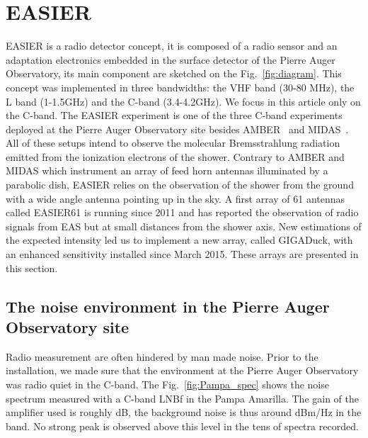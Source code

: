 \section{EASIER}
EASIER is a radio detector concept, it is composed of a radio sensor and an adaptation electronics embedded in the surface detector of the Pierre Auger Observatory, its main component are sketched on the Fig.~\ref{fig:diagram}. This concept was implemented in three bandwidths: the VHF band (30-80 MHz), the L band (1-1.5GHz) and the C-band (3.4-4.2GHz). We focus in this article only on the C-band. The  EASIER experiment  is one  of the  three C-band experiments  deployed at  the  Pierre Auger  Observatory site  besides AMBER~\cite{Gorham} and MIDAS~\cite{midas}. All of these setups intend to observe the molecular Bremsstrahlung radiation emitted from the ionization electrons of the shower. Contrary to AMBER and MIDAS which instrument an array of feed  horn antennas illuminated by a parabolic  dish, EASIER  relies on the observation of the shower  from the  ground with  a wide  angle antenna  pointing up in the sky.
A first array of 61 antennas called EASIER61 is running  since  2011 and has reported the observation of radio signals from EAS but at small distances from the shower axis. New estimations of the expected intensity led us to implement a new array, called GIGADuck, with an enhanced sensitivity installed since March 2015. These arrays are presented in this section.  
\subsection {The noise environment in the Pierre Auger Observatory site}
Radio measurement are often hindered by man made noise. Prior to  the installation,  we made sure that the environment at the Pierre Auger Observatory was radio quiet in the C-band.  The Fig.~\ref{fig:Pampa_spec} shows the noise spectrum measured  with  a C-band  LNBf  in the  Pampa Amarilla. The gain of the amplifier used is roughly \unit[60]{dB}, the background noise is thus around \unit[-180]{dBm/Hz} in the band. No strong peak is observed above this level in the tens of spectra recorded.
 \begin{figure}[!h]
\end{figure}


